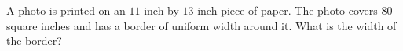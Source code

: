 A photo is printed on an $11$-inch by $13$-inch piece of paper. The photo covers $80$ square inches and has a border of uniform width around it. What is the width of the border?
